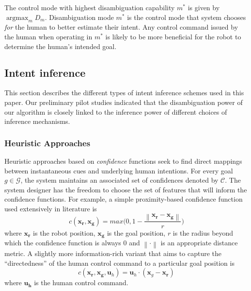 \documentclass[conference]{IEEEtran}
\DeclareMathOperator*{\argmax}{argmax}
\newcommand{\norm}[1]{\left\lVert#1\right\rVert}
\begin{document}
The control mode with highest disambiguation capability $m^*$ is given by $\argmax_m D_m$. Disambiguation mode $m^*$ is the control mode that system chooses \textit{for} the human to better estimate their intent. Any control command issued by the human when operating in $m^*$ is likely to be more beneficial for the robot to determine the human's intended goal. 

\subsection{Intent inference}\label{ssec:inference}
This section describes the different types of intent inference schemes used in this paper. Our preliminary pilot studies indicated that the disambiguation power of our algorithm is closely linked to the inference power of different choices of inference mechanisms. 

\subsubsection{Heuristic Approaches}
Heuristic approaches based on \textit{confidence} functions seek to find direct mappings between instantaneous cues and underlying human intentions. For every goal $g \in \mathcal{G}$, the system maintains an associated set of confidences denoted by $\mathcal{C}$. The system designer has the freedom to choose the set of features that will inform the confidence functions. For example, a simple proximity-based confidence function used extensively in literature is
\begin{equation}
c(\boldsymbol{x_r}, \boldsymbol{x_g}) = max\Big(0, 1 - \frac{\norm{\boldsymbol{x_r} - \boldsymbol{x_g}}}{r}\Big)
\end{equation}
where $\boldsymbol{x_r}$ is the robot position, $\boldsymbol{x_g}$ is the goal position, $r$ is the radius beyond which the confidence function is always 0 and $\norm{\cdot}$ is an appropriate distance metric. 
A slightly more information-rich variant that aims to capture the ``directedness'' of the human control command to a particular goal position is
\begin{equation*}
c({\boldsymbol{x_r},\boldsymbol{x_g}, \boldsymbol{u}_{h}}) = \boldsymbol{u}_h\cdot(\boldsymbol{x}_{g} - \boldsymbol{x_r})
\end{equation*}
where $\boldsymbol{u_h}$ is the human control command. 
\end{document}
